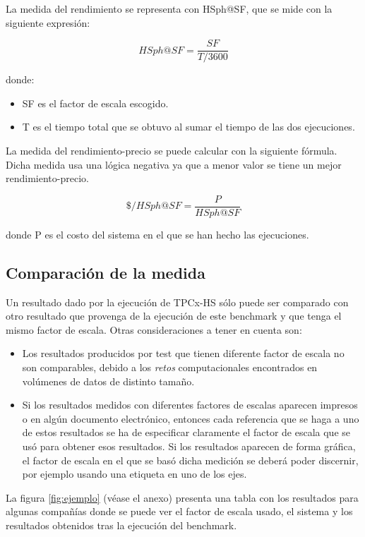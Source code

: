 \documentclass[10pt]{article}
\begin{document}
		La medida del rendimiento se representa con HSph@SF, que se mide con la siguiente expresión:
		
		$$ HSph@SF = \frac{SF}{T/3600} $$
		
		donde:
		\begin{itemize}
			\item SF es el factor de escala escogido.
			\item T es el tiempo total que se obtuvo al sumar el tiempo de las dos ejecuciones. \\
		\end{itemize}	
		
		La medida del rendimiento-precio se puede calcular con la siguiente fórmula. Dicha medida usa una lógica negativa ya que a menor valor se tiene un mejor rendimiento-precio.
		
		$$ \$/HSph@SF = \frac{P}{HSph@SF} $$
		
		donde P es el costo del sistema en el que se han hecho las ejecuciones.
		
		
		\subsection{Comparación de la medida}
		
		Un resultado dado por la ejecución de TPCx-HS sólo puede ser comparado con otro resultado que provenga de la ejecución de este benchmark y que tenga el mismo factor de escala. Otras consideraciones a tener en cuenta son:
		
		\begin{itemize}
			\item Los resultados producidos por test que tienen diferente factor de escala no son comparables, debido a los \textit{retos} computacionales encontrados en volúmenes de datos de distinto tamaño.
			\item Si los resultados medidos con diferentes factores de escalas aparecen impresos o en algún documento electrónico, entonces cada referencia que se haga a uno de estos resultados se ha de especificar claramente el factor de escala que se usó para obtener esos resultados. Si los resultados aparecen de forma gráfica, el factor de escala en el que se basó dicha medición se deberá poder discernir, por ejemplo usando una etiqueta en uno de los ejes.
		\end{itemize}
		
		
		La figura \ref{fig:ejemplo} (véase el anexo) presenta una tabla con los resultados para algunas compañías donde se puede ver el factor de escala usado, el sistema y los resultados obtenidos tras la ejecución del benchmark.
\end{document}
